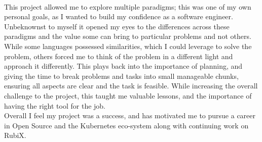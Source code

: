 \\This project allowed me to explore multiple paradigms; this was one of my own personal goals, as I wanted to build my confidence as a software engineer. Unbeknownst to myself it opened my eyes to the differences across these paradigms and the value some can bring to particular problems and not others. While some languages possessed similarities, which I could leverage to solve the problem, others forced me to think of the problem in a different light and approach it differently. This plays back into the importance of planning, and giving the time to break problems and tasks into small manageable chunks, ensuring all aspects are clear and the task is feasible. While increasing the overall challenge to the project, this taught me valuable lessons, and the importance of having the right tool for the job.
\\Overall I feel my project was a success, and has motivated me to pursue a career in Open Source and the Kubernetes eco-system along with continuing work on RubiX.
